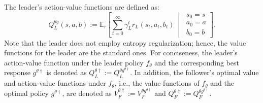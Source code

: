 \documentclass[letterpaper]{article} %
\providecommand{\E}{\mathbb{E}} %
\begin{document}
The leader's action-value functions are defined as:
\begin{equation*}
    Q_L^{{\theta} {g}}(s,a,b) :=\E_\tau\left[\sum_{t=0}^\infty\gamma_L^t r_L(s_t,a_t,b_t)~\middle|~\begin{array}{l}s_0=s\\a_0=a\\b_0=b\end{array}\right].
\end{equation*}
Note that the leader does not employ entropy regularization; hence, the value functions for the leader are the standard ones.
For conciseness, the leader's action-value function under the leader policy $f_{{\theta}}$ and the corresponding best response $g^{\theta\dagger}$ is denoted as
$Q_L^{{\theta} \dagger} := Q_L^{{\theta} {g^{\theta\dagger}}}$.
In addition, the follower's optimal value and action-value functions under $f_{{\theta}}$, i.e., the value functions of $f_{{\theta}}$ and the optimal policy $g^{\theta\dagger}$, are denoted as
$V_F^{{\theta} \dagger} :=  V_F^{{\theta} {g^{\theta\dagger}}}$ and $Q_F^{{\theta} \dagger} := Q_F^{{\theta} {g^{\theta\dagger}}}$.


\end{document}
